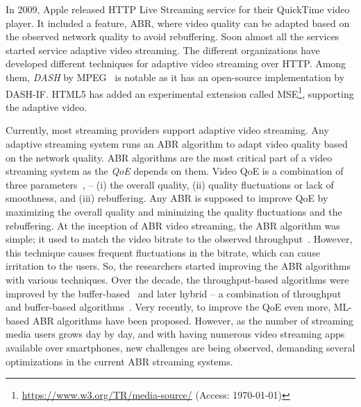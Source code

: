 In 2009, Apple released \ac{HTTP} Live Streaming service for their QuickTime video player. It included a feature, \ac{ABR}, where video quality can be adapted based on the observed network quality to avoid rebuffering. Soon almost all the services started service adaptive video streaming. The different organizations have developed different techniques for adaptive video streaming over \ac{HTTP}. Among them, \textit{\ac{DASH}} by MPEG~\cite{ISO/IEC23009-1:2019} is notable as it has an open-source implementation by \ac{DASH-IF}. \ac{HTML5} has added an experimental extension called \ac{MSE}\footnote{\url{https://www.w3.org/TR/media-source/} (Access: \today)}, supporting the adaptive video. 


Currently, most streaming providers support adaptive video streaming. Any adaptive streaming system runs an \ac{ABR} algorithm to adapt video quality based on the network quality. \ac{ABR} algorithms are the most critical part of a video streaming system as the \textit{\ac{QoE}} depends on them. Video \ac{QoE} is a combination of three parameters~\cite{yin2015control}, -- (i) the overall quality, (ii) quality fluctuations or lack of smoothness, and (iii) rebuffering. Any \ac{ABR} is supposed to improve \ac{QoE} by maximizing the overall quality and minimizing the quality fluctuations and the rebuffering. At the inception of \ac{ABR} video streaming, the \ac{ABR} algorithm was simple; it used to match the video bitrate to the observed throughput~\cite{5677508,10.1145/1943552.1943575,10.1145/1943552.1943574}. However, this technique causes frequent fluctuations in the bitrate, which can cause irritation to the users. So, the researchers started improving the \ac{ABR} algorithms with various techniques. Over the decade, the throughput-based algorithms were improved by the buffer-based~\cite{Spiteri2016,10.1145/2910017.2910596,7393865} and later hybrid -- a combination of throughput and buffer-based algorithms~\cite{7247436,140405,yin2015control,10.1145/2670518.2673877}. Very recently, to improve the \ac{QoE} even more, \ac{ML}-based\cite{mao2017neural,Akhtar2018,9155492} \ac{ABR} algorithms have been proposed. However, as the number of streaming media users grows day by day, and with having numerous video streaming apps available over smartphones, new challenges are being observed, demanding several optimizations in the current \ac{ABR} streaming systems. 

